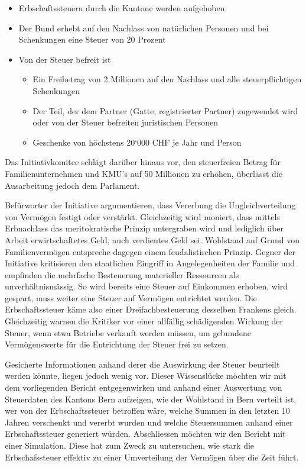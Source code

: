\documentclass[a4paper, 12pt,liststotoc]{scrartcl}
\numberwithin{equation}{section}
\begin{document}
\begin{itemize}
\item
  Erbschaftssteuern durch die Kantone werden aufgehoben
\item
  Der Bund erhebt auf den Nachlass von natürlichen Personen und bei
  Schenkungen eine Steuer von 20 Prozent
\item
  Von der Steuer befreit ist

  \begin{itemize}
  \item
    Ein Freibetrag von 2 Millionen auf den Nachlass und alle
    steuerpflichtigen Schenkungen
  \item
    Der Teil, der dem Partner (Gatte, registrierter Partner) zugewendet
    wird oder von der Steuer befreiten juristischen Personen
  \item
    Geschenke von höchstens 20`000 CHF je Jahr und Person
  \end{itemize}
\end{itemize}

Das Initiativkomitee schlägt darüber hinaus vor, den steuerfreien Betrag
für Familienunternehmen und KMU's auf 50 Millionen zu erhöhen, überlässt
die Ausarbeitung jedoch dem Parlament.

Befürworter der Initiative argumentieren, dass Vererbung die
Ungleichverteilung von Vermögen festigt oder verstärkt. Gleichzeitig
wird moniert, dass mittels Erbnachlass das meritokratische Prinzip
untergraben wird und lediglich über Arbeit erwirtschaftetes Geld, auch
verdientes Geld sei. Wohlstand auf Grund von Familienvermögen entspreche
dagegen einem feudalistischen Prinzip. Gegner der Initiative kritisieren
den staatlichen Eingriff in Angelegenheiten der Familie und empfinden
die mehrfache Besteuerung materieller Ressourcen als unverhältnismässig.
So wird bereits eine Steuer auf Einkommen erhoben, wird gespart, muss
weiter eine Steuer auf Vermögen entrichtet werden. Die Erbschaftssteuer
käme also einer Dreifachbesteuerung desselben Frankens gleich.
Gleichzeitig warnen die Kritiker vor einer allfällig schädigenden
Wirkung der Steuer, wenn etwa Betriebe verkauft werden müssen, um
gebundene Vermögenswerte für die Entrichtung der Steuer frei zu setzen.

Gesicherte Informationen anhand derer die Auswirkung der Steuer
beurteilt werden könnte, liegen jedoch wenig vor. Dieser Wissenslücke
möchten wir mit dem vorliegenden Bericht entgegenwirken und anhand einer
Auswertung von Steuerdaten des Kantons Bern aufzeigen, wie der Wohlstand
in Bern verteilt ist, wer von der Erbschaftssteuer betroffen wäre,
welche Summen in den letzten 10 Jahren verschenkt und vererbt wurden und
welche Steuersummen anhand einer Erbschaftssteuer generiert würden.
Abschliessen möchten wir den Bericht mit einer Simulation. Diese hat zum
Zweck zu untersuchen, wie stark die Erbschafssteuer effektiv zu einer
Umverteilung der Vermögen über die Zeit führt.
\end{document}
